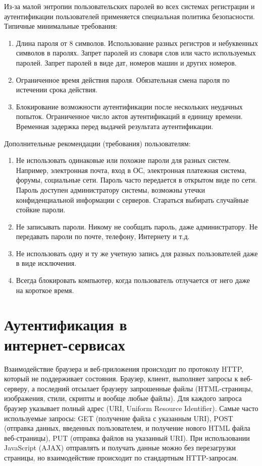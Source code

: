 \documentclass[10pt,a4paper]{book}
\begin{document}
Из-за малой энтропии пользовательских паролей во всех системах регистрации и аутентификации пользователей применяется специальная политика безопасности. Типичные минимальные требования:
\begin{enumerate}
    \item Длина пароля от 8 символов. Использование разных регистров и небуквенных символов в паролях. Запрет паролей из словаря слов или часто используемых паролей. Запрет паролей в виде дат, номеров машин и других номеров.
    \item Ограниченное время действия пароля. Обязательная смена пароля по истечении срока действия.
    \item Блокирование возможности аутентификации после нескольких неудачных попыток. Ограниченное число актов аутентификаций в единицу времени. Временная задержка перед выдачей результата аутентификации.
\end{enumerate}

Дополнительные рекомендации (требования) пользователям:
\begin{enumerate}
    \item Не использовать одинаковые или похожие пароли для разных систем. Например, электронная почта, вход в ОС, электронная платежная система, форумы, социальные сети. Пароль часто передается в открытом виде по сети. Пароль доступен администратору системы, возможны утечки конфиденциальной информации с серверов. Стараться выбирать случайные стойкие пароли.
    \item Не записывать пароли. Никому не сообщать пароль, даже администратору. Не передавать пароли по почте, телефону, Интернету и т.д.
    \item Не использовать одну и ту же учетную запись для разных пользователей даже в виде исключения.
    \item Всегда блокировать компьютер, когда пользователь отлучается от него даже на короткое время.
\end{enumerate}



\section[Аутентификация в интернет-сервисах]{Аутентификация в \protect\\ интернет-сервисах}

Взаимодействие браузера и веб-приложения происходит по протоколу HTTP, который не поддерживает состояния. Браузер, клиент, выполняет запросы к веб-серверу, а последний отсылает браузеру запрошенные файлы (HTML-страницы, изображения, стили, скрипты и вообще любые файлы). Для каждого запроса браузер указывает полный адрес (URI, Uniform Resource Identifier). Самые часто используемые запросы: GET (получение файла с указанным URI), POST (отправка данных, введенных пользователем, и получение нового HTML файла веб-страницы), PUT (отправка файлов на указанный URI). При использовании JavaScript (AJAX) отправлять и получать данные можно без перезагрузки страницы, но взаимодействие происходит по стандартным HTTP-запросам.
\end{document}
